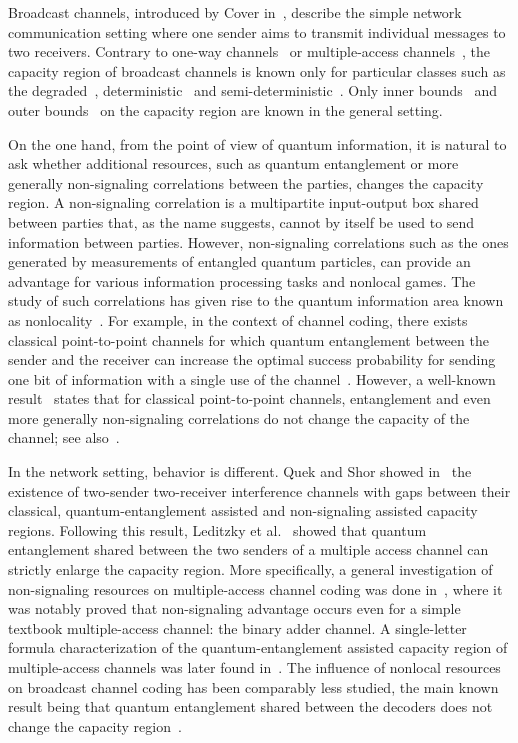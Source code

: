 Broadcast channels, introduced by Cover in~\cite{Cover72}, describe the simple network communication setting where one sender aims to transmit individual messages to two receivers. Contrary to one-way channels~\cite{Shannon48} or multiple-access channels~\cite{Liao73,Ahlswede73}, the capacity region of broadcast channels is known only for particular classes such as the degraded~\cite{Bergmans73,Gallager74,AK75}, deterministic~\cite{Marton77,Pinsker78} and semi-deterministic~\cite{GIP80}. Only inner bounds~\cite{Cover75,Meulen75,Marton79} and outer bounds~\cite{Sato78,Marton79,NG07,GN20} on the capacity region are known in the general setting.

On the one hand, from the point of view of quantum information, it is natural to ask whether additional resources, such as quantum entanglement or more generally non-signaling correlations between the parties, changes the capacity region. A non-signaling correlation is a multipartite input-output box shared between parties that, as the name suggests, cannot by itself be used to send information between parties. However, non-signaling correlations such as the ones generated by measurements of entangled quantum particles, can provide an advantage for various information processing tasks and nonlocal games. The study of such correlations has given rise to the quantum information area known as nonlocality~\cite{BCPSW14}. For example, in the context of channel coding, there exists classical point-to-point channels for which quantum entanglement between the sender and the receiver can increase the optimal success probability for sending one bit of information with a single use of the channel~\cite{PLMK11,BF18}. However, a well-known result~\cite{BSST99} states that for classical point-to-point channels, entanglement and even more generally non-signaling correlations do not change the capacity of the channel; see also~\cite{Matthews12,BF18}.

In the network setting, behavior is different. Quek and Shor showed in~\cite{QS17} the existence of two-sender two-receiver interference channels with gaps between their classical, quantum-entanglement assisted and non-signaling assisted capacity regions. Following this result, Leditzky et al.~\cite{LALS20,SLSS22} showed that quantum entanglement shared between the two senders of a multiple access channel can strictly enlarge the capacity region. More specifically, a general investigation of non-signaling resources on multiple-access channel coding was done in~\cite{FF22}, where it was notably proved that non-signaling advantage occurs even for a simple textbook multiple-access channel: the binary adder channel. A single-letter formula characterization of the quantum-entanglement assisted capacity region of multiple-access channels was later found in~\cite{PDB23}. The influence of nonlocal resources on broadcast channel coding has been comparably less studied, the main known result being that quantum entanglement shared between the decoders does not change the capacity region~\cite{PDB21}.

